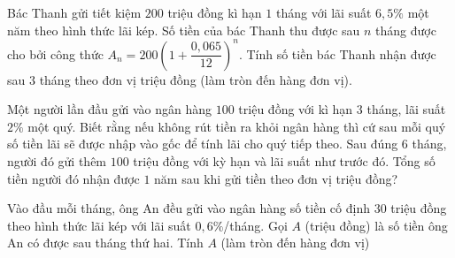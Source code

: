 \begin{ex}%
	Bác Thanh gửi tiết kiệm $200$ triệu đồng kì hạn $1$ tháng với lãi suất $6{,}5\%$ một năm theo hình thức lãi kép. Số tiền của bác Thanh thu được sau $n$ tháng được cho bởi công thức $A_n=200\left( 1+\dfrac{0{,}065}{12}  \right)^n$. Tính số tiền bác Thanh nhận được sau $3$ tháng theo đơn vị triệu đồng (làm tròn đến hàng đơn vị).
\end{ex}

\begin{ex}%
	Một người lần đầu gửi vào ngân hàng $100$ triệu đồng với kì hạn $3$ tháng, lãi suất $2\%$ một quý. Biết rằng nếu không rút  tiền ra khỏi ngân hàng thì cứ sau mỗi quý số tiền lãi sẽ được nhập vào gốc để tính lãi cho quý tiếp theo. Sau đúng $6$ tháng, người đó gửi thêm $100$ triệu đồng với kỳ hạn và lãi suất như trước đó. Tổng số tiền người đó nhận được $1$ năm sau khi gửi tiền theo đơn vị triệu đồng?
\end{ex}

\begin{ex}%
	Vào đầu mỗi tháng, ông An đều gửi vào ngân hàng số tiền cố định $30$ triệu đồng  theo hình thức lãi kép với lãi suất $0{,}6 \%$/tháng. Gọi $A$ (triệu đồng) là số tiền ông An có được sau tháng thứ hai. Tính $A$ (làm tròn đến hàng đơn vị)
\end{ex}

